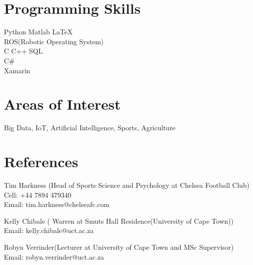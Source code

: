 \documentclass[]{deedy-resume-openfont}
\begin{document}
%
%
\begin{minipage}[t]{0.33\textwidth} 


\section{Programming Skills}
Python \textbullet{} Matlab \textbullet{} \LaTeX\ \\
\textbullet{} ROS(Robotic Operating System)  \\
\textbullet{} C \textbullet{} C++ \textbullet{} SQL \\
C$\#$\\
Xamarin 
\sectionsep

\section{Areas of Interest}
Big Data, IoT, Artificial Intelligence, Sports, Agriculture
 
 

\section{References}

Tim Harkness (Head of Sports Science and Psychology at Chelsea Football Club)\\
Cell: +44 7894 479340 \\
Email: tim.harkness@chelseafc.com \\
\sectionsep

Kelly Chibale ( Warren at Smuts Hall Residence(University of Cape Town))\\
Email: kelly.chibale@uct.ac.za \\
\sectionsep

Robyn Verrinder(Lecturer at University of Cape Town and MSc Supervisor) \\
Email: robyn.verrinder@uct.ac.za \\
\sectionsep



\end{minipage} 
\hfill
\end{document}
